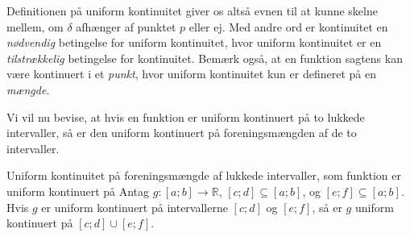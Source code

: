Definitionen på uniform kontinuitet giver os altså evnen til at kunne skelne mellem, om $\delta $ afhænger af punktet $p$ eller ej. 
Med andre ord er kontinuitet en \textit{nødvendig} betingelse for uniform kontinuitet, hvor uniform kontinuitet er en \textit{tilstrækkelig} betingelse for kontinuitet.
Bemærk også, at en funktion sagtens kan være kontinuert i et \textit{punkt}, hvor uniform kontinuitet kun er defineret på en \textit{mængde}.

Vi vil nu bevise, at hvis en funktion er uniform kontinuert på to lukkede intervaller, så er den uniform kontinuert på foreningsmængden af de to intervaller.

\begin{theorem}[label=theo:uniform_fælles]{Uniform kontinuitet på foreningsmængde af lukkede intervaller, som funktion er uniform kontinuert på}{}
  Antag $g:[a;b]\to \mathbb{R}$, $[c;d] \subseteq [a;b]$, og $[e;f]\subseteq [a;b]$.
  Hvis $g$ er uniform kontinuert på intervallerne $[c;d]$ og $[e;f]$, så er $g$ uniform kontinuert på $[c;d] \cup [e;f]$.
\end{theorem}
